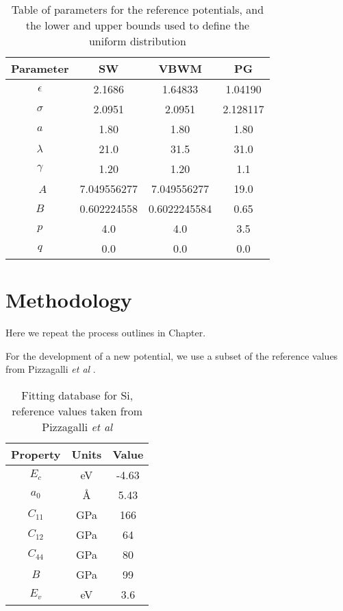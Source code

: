\begin{table}[htbp]
	\centering
	\caption{Table of parameters for the reference potentials, and the lower and upper bounds used to define the uniform distribution}
	\label{table:sw_parameters_ref}
	\begin{tabular}{c c c c}
		\hline 
		Parameter & SW & VBWM & PG \\
		\hline
		$\epsilon$ & 2.1686 & 1.64833 & 1.04190 \\
		$\sigma$ &   2.0951 & 2.0951 & 2.128117 \\
		$a$ &       1.80 & 1.80 & 1.80 \\
		$\lambda$ & 21.0 & 31.5 & 31.0 \\
		$\gamma$ & 1.20 & 1.20 & 1.1 \\\
		$A$ & 7.049556277 & 7.049556277 & 19.0 \\
		$B$ & 0.602224558 & 0.6022245584 & 0.65 \\
		$p$ & 4.0 & 4.0 & 3.5 \\
		$q$ & 0.0 & 0.0 & 0.0 \\
		\hline
	\end{tabular}
\end{table}

\section{Methodology}

Here we repeat the process outlines in Chapter.

For the development of a new potential, we use a subset of the reference values from Pizzagalli \emph{et al} \cite{pizzagalli2013_sw_Si}.

\begin{table}[htbp]
	\centering
	\caption{Fitting database for Si, reference values taken from Pizzagalli \emph{et al}\cite{pizzagalli2013_sw_Si}}
	\label{table:si_fitting_db}
	\begin{tabular}{c c c}
		\hline
		Property & Units & Value \\
		\hline
		$E_c$ 		& eV 	& -4.63 \\
		$a_0$ 		& \AA 	&  5.43 \\
		$C_{11}$ 	& GPa 	& 166 \\
		$C_{12}$ 	& GPa 	& 64 \\
		$C_{44}$ 	& GPa 	& 80 \\
		$B$ 		& GPa 	& 99 \\
		$E_v$ 		& eV 	& 3.6 \\
		\hline
	\end{tabular}
\end{table}

